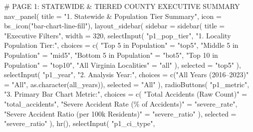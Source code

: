 \documentclass[
  letterpaper,
  DIV=11,
  numbers=noendperiod]{scrartcl}
\newenvironment{Shaded}{\begin{snugshade}}{\end{snugshade}}
\newcommand{\AttributeTok}[1]{\textcolor[rgb]{0.40,0.45,0.13}{#1}}
\newcommand{\CommentTok}[1]{\textcolor[rgb]{0.37,0.37,0.37}{#1}}
\newcommand{\DecValTok}[1]{\textcolor[rgb]{0.68,0.00,0.00}{#1}}
\newcommand{\FunctionTok}[1]{\textcolor[rgb]{0.28,0.35,0.67}{#1}}
\newcommand{\NormalTok}[1]{\textcolor[rgb]{0.00,0.23,0.31}{#1}}
\newcommand{\OtherTok}[1]{\textcolor[rgb]{0.00,0.23,0.31}{#1}}
\newcommand{\StringTok}[1]{\textcolor[rgb]{0.13,0.47,0.30}{#1}}
\begin{document}
\begin{Shaded}
\begin{Highlighting}[]
  \CommentTok{\# PAGE 1: STATEWIDE \& TIERED COUNTY EXECUTIVE SUMMARY}
  \FunctionTok{nav\_panel}\NormalTok{(}
    \AttributeTok{title =} \StringTok{"1. Statewide \& Population Tier Summary"}\NormalTok{,}
    \AttributeTok{icon =} \FunctionTok{bs\_icon}\NormalTok{(}\StringTok{"bar{-}chart{-}line{-}fill"}\NormalTok{),}
    \FunctionTok{layout\_sidebar}\NormalTok{(}
      \AttributeTok{sidebar =} \FunctionTok{sidebar}\NormalTok{(}
        \AttributeTok{title =} \StringTok{"Executive Filters"}\NormalTok{,}
        \AttributeTok{width =} \DecValTok{320}\NormalTok{,}
        \FunctionTok{selectInput}\NormalTok{(}
          \StringTok{"p1\_pop\_tier"}\NormalTok{,}
          \StringTok{"1. Locality Population Tier:"}\NormalTok{,}
          \AttributeTok{choices =} \FunctionTok{c}\NormalTok{(}
            \StringTok{"Top 5 in Population"}     \OtherTok{=} \StringTok{"top5"}\NormalTok{,}
            \StringTok{"Middle 5 in Population"}  \OtherTok{=} \StringTok{"mid5"}\NormalTok{,}
            \StringTok{"Bottom 5 in Population"}  \OtherTok{=} \StringTok{"bot5"}\NormalTok{,}
            \StringTok{"Top 10 in Population"}    \OtherTok{=} \StringTok{"top10"}\NormalTok{,}
            \StringTok{"All Virginia Localities"} \OtherTok{=} \StringTok{"all"}
\NormalTok{          ),}
          \AttributeTok{selected =} \StringTok{"top5"}
\NormalTok{        ),}
        \FunctionTok{selectInput}\NormalTok{(}
          \StringTok{"p1\_year"}\NormalTok{,}
          \StringTok{"2. Analysis Year:"}\NormalTok{,}
          \AttributeTok{choices =} \FunctionTok{c}\NormalTok{(}\StringTok{"All Years (2016–2023)"} \OtherTok{=} \StringTok{"All"}\NormalTok{, }\FunctionTok{as.character}\NormalTok{(all\_years)),}
          \AttributeTok{selected =} \StringTok{"All"}
\NormalTok{        ),}
        \FunctionTok{radioButtons}\NormalTok{(}
          \StringTok{"p1\_metric"}\NormalTok{,}
          \StringTok{"3. Primary Bar Chart Metric:"}\NormalTok{,}
          \AttributeTok{choices =} \FunctionTok{c}\NormalTok{(}
            \StringTok{"Total Accidents (Raw Count)"}                \OtherTok{=} \StringTok{"total\_accidents"}\NormalTok{,}
            \StringTok{"Severe Accident Rate (\% of Accidents)"}      \OtherTok{=} \StringTok{"severe\_rate"}\NormalTok{,}
            \StringTok{"Severe Accident Ratio (per 100k Residents)"} \OtherTok{=} \StringTok{"severe\_ratio"}
\NormalTok{          ),}
          \AttributeTok{selected =} \StringTok{"severe\_ratio"}
\NormalTok{        ),}
        \FunctionTok{hr}\NormalTok{(),}
        \FunctionTok{selectInput}\NormalTok{(}
          \StringTok{"p1\_ci\_type"}\NormalTok{,}

\end{Highlighting}
\end{Shaded}
\end{document}
